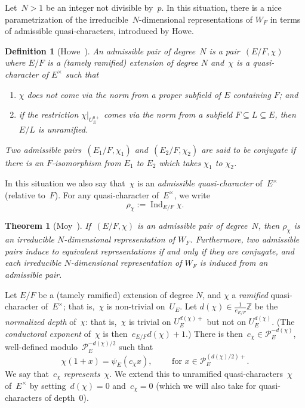 \documentclass[12pt]{amsart}
\newcommand{\BZ}{\mathbb {Z}}
\newcommand{\CP}{\mathcal {P}}
\newcommand{\Ind}{\operatorname{Ind}}
\newtheorem{thm}{Theorem}[section]
\newtheorem{defn}[thm]{Definition}
\newtheorem{thm}[equation]{Theorem}
\newtheorem{defn}[equation]{Definition}
\begin{document}
Let~$N>1$ be an integer not divisible by~$p$. In this situation, there is a nice parametrization of the irreducible~$N$-dimensional representations of $W_F$ in terms of admissible quasi-characters, introduced by Howe.

\begin{defn}[Howe~\cite{Ho77}]
An \emph{admissible pair} of degree~$N$ is a pair~$(E/F,\chi)$ where $E/F$ is a (tamely ramified) extension of degree $N$ and~$\chi$ is a quasi-character of $E^{\times}$ such that
\begin{enumerate}
\item $\chi$ does not come via the norm from a proper subfield of $E$ containing $F$; and
\item if the restriction $\chi|_{U_E^{0+}}$ comes via the norm from a subfield $F \subseteq L \subseteq E$, then $E/L$ is unramified.
\end{enumerate}
Two admissible pairs~$(E_1/F,\chi_1)$ and~$(E_2/F,\chi_2)$ are said to be \emph{conjugate} if there is an $F$-isomorphism from $E_1$ to $E_2$ which takes $\chi_1$ to $\chi_2$.
\end{defn}
In this situation we also say that~$\chi$ is an \emph{admissible quasi-character} of~$E^\times$ (relative to~$F$). For any quasi-character of~$E^\times$, we write
\[
\rho_\chi:=\Ind_{E/F}\chi.
\]

\begin{thm}[{Moy~\cite[Theorem 2.2.2]{M86}}]\label{thm:moy1}
If~$(E/F,\chi)$ is an admissible pair of degree~$N$, then $\rho_\chi$ is an irreducible $N$-dimensional representation of $W_F$. Furthermore, two admissible pairs induce to equivalent representations if and only if they are conjugate, and each irreducible $N$-dimensional representation of $W_F$ is induced from an admissible pair.
\end{thm}

Let $E/F$ be a (tamely ramified) extension of degree $N$, and $\chi$ a \emph{ramified} quasi-character of~$E^{\times}$; that is,~$\chi$ is non-trivial on~$U_E$. Let $d(\chi)\in \frac 1{e_{E/F}}\BZ$ be the \emph{normalized depth} of~$\chi$: that is,~$\chi$ is trivial on $U_E^{d(\chi)+}$ but not on $U_E^{d(\chi)}$. (The \emph{conductoral exponent} of~$\chi$ is then~$e_{E/F} d(\chi)+1$.) There is then~$c_{\chi} \in \CP_E^{-d(\chi)}$, well-defined modulo~$\CP_E^{- {d(\chi)}/2}$ such that
\[
\chi(1+x)=\psi_E(c_{\chi}x),\qquad\text{ for }x\in\CP_E^{(d(\chi)/2)+}.
\]
We say that~$c_\chi$ \emph{represents}~$\chi$. We extend this to unramified quasi-characters~$\chi$ of~$E^\times$ by setting~$d(\chi)=0$ and~$c_\chi=0$ (which we will also take for quasi-characters of depth~$0$).
\end{document}
